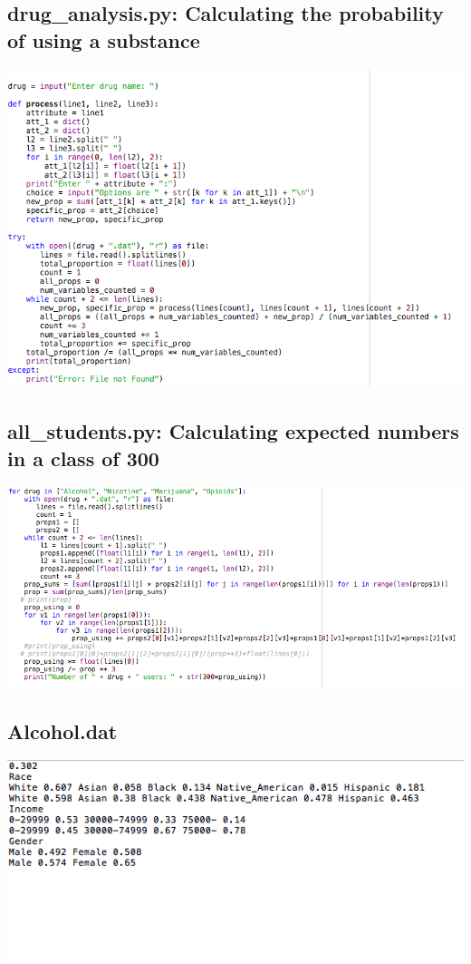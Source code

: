 \documentclass{article}
\begin{document}
\subsection{drug\_analysis.py: Calculating the probability of using a substance}
\includegraphics[width=\textwidth]{druganalysis.png}
\subsection{all\_students.py: Calculating expected numbers in a class of 300}
\includegraphics[width=\textwidth]{class.png}
\subsection{Alcohol.dat}
\includegraphics{alc.png}
\end{document}
